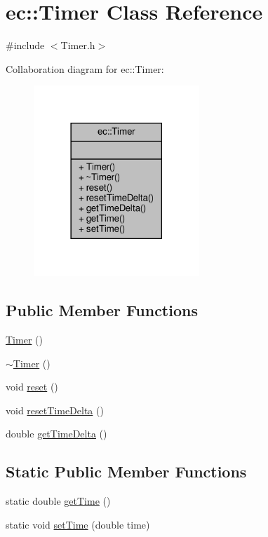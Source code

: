 \hypertarget{classec_1_1_timer}{}\section{ec\+:\+:Timer Class Reference}
\label{classec_1_1_timer}


{\ttfamily \#include $<$Timer.\+h$>$}



Collaboration diagram for ec\+:\+:Timer\+:\nopagebreak
\begin{figure}[H]
\begin{center}
\leavevmode
\includegraphics[width=177pt]{classec_1_1_timer__coll__graph}
\end{center}
\end{figure}
\subsection*{Public Member Functions}
\begin{DoxyCompactItemize}
\item 
\mbox{\hyperlink{classec_1_1_timer_afa10f411221610c507291183b6b6aa56}{Timer}} ()
\item 
\mbox{\hyperlink{classec_1_1_timer_a496dc6127f9d0c8ec3dc8d91de6b6448}{$\sim$\+Timer}} ()
\item 
void \mbox{\hyperlink{classec_1_1_timer_a0f712ea9fa17c4657a877b9322219aa3}{reset}} ()
\item 
void \mbox{\hyperlink{classec_1_1_timer_a9c0d47620b70d0d7f392a9837601dad3}{reset\+Time\+Delta}} ()
\item 
double \mbox{\hyperlink{classec_1_1_timer_a17b6b8d3cf83bb86df9164160b791016}{get\+Time\+Delta}} ()
\end{DoxyCompactItemize}
\subsection*{Static Public Member Functions}
\begin{DoxyCompactItemize}
\item 
static double \mbox{\hyperlink{classec_1_1_timer_afdd04188d609cf55b9546d32a89f52dc}{get\+Time}} ()
\item 
static void \mbox{\hyperlink{classec_1_1_timer_ab1731ad2f23bc4b37a6bc5b061846dd6}{set\+Time}} (double time)
\end{DoxyCompactItemize}


